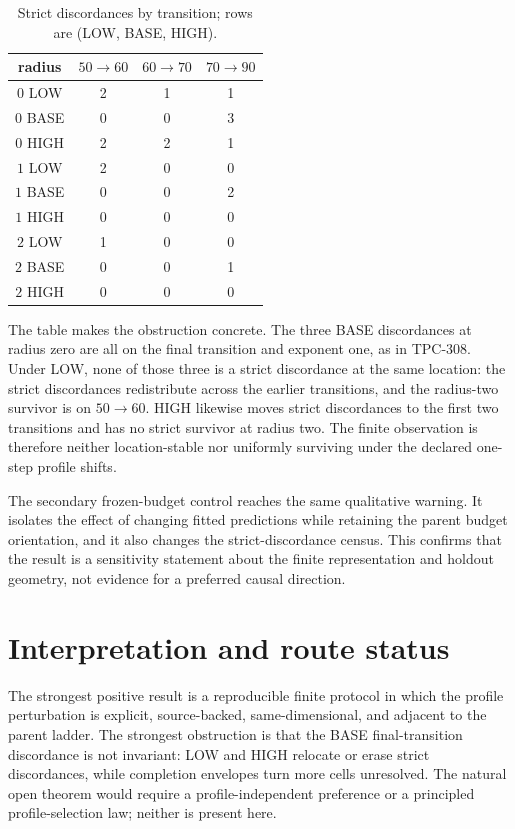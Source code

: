 \documentclass[11pt]{article}
\begin{document}
\begin{table}[t]
\centering\small
\caption{Strict discordances by transition; rows are (LOW, BASE, HIGH).}
\label{tab:discordance}
\begin{tabular}{c c c c}
\toprule
radius & $50\to60$ & $60\to70$ & $70\to90$\\
\midrule
$0$ LOW  & 2 & 1 & 1\\
$0$ BASE & 0 & 0 & 3\\
$0$ HIGH & 2 & 2 & 1\\
$1$ LOW  & 2 & 0 & 0\\
$1$ BASE & 0 & 0 & 2\\
$1$ HIGH & 0 & 0 & 0\\
$2$ LOW  & 1 & 0 & 0\\
$2$ BASE & 0 & 0 & 1\\
$2$ HIGH & 0 & 0 & 0\\
\bottomrule
\end{tabular}
\end{table}

The table makes the obstruction concrete.  The three BASE discordances at
radius zero are all on the final transition and exponent one, as in TPC-308.
Under LOW, none of those three is a strict discordance at the same location:
the strict discordances redistribute across the earlier transitions, and the
radius-two survivor is on $50\to60$.  HIGH likewise moves strict discordances
to the first two transitions and has no strict survivor at radius two.  The
finite observation is therefore neither location-stable nor uniformly
surviving under the declared one-step profile shifts.

The secondary frozen-budget control reaches the same qualitative warning.
It isolates the effect of changing fitted predictions while retaining the
parent budget orientation, and it also changes the strict-discordance census.
This confirms that the result is a sensitivity statement about the finite
representation and holdout geometry, not evidence for a preferred causal
direction.

\section{Interpretation and route status}

The strongest positive result is a reproducible finite protocol in which the
profile perturbation is explicit, source-backed, same-dimensional, and
adjacent to the parent ladder.  The strongest obstruction is that the BASE
final-transition discordance is not invariant: LOW and HIGH relocate or erase
strict discordances, while completion envelopes turn more cells unresolved.
The natural open theorem would require a profile-independent preference or a
principled profile-selection law; neither is present here.
\end{document}
